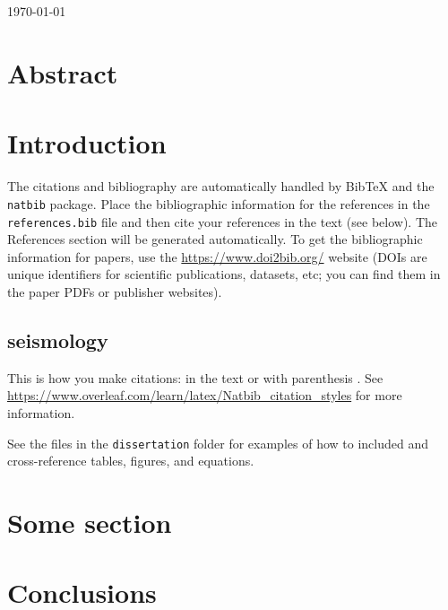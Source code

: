\documentclass[12pt,a4paper,onecolumn,oneside]{article}
\begin{document}
\thispagestyle{empty}
\begin{center}
  {\LARGE \Title{}}
  \\[0.3cm]
  {\large \Name{}}
  \\[0.3cm]
  {\monthyear\today}
\end{center}


\section*{Abstract}

\lipsum[1]



\section{Introduction}

The citations and bibliography are automatically handled by
BibTeX and the \texttt{natbib} package. Place the bibliographic information for
the references in the \texttt{references.bib} file and then cite your
references in the text (see below). The References section will be generated
automatically. To get the bibliographic information for papers, use the
\url{https://www.doi2bib.org/} website (DOIs are unique identifiers for
scientific publications, datasets, etc; you can find them in the paper PDFs or
publisher websites). \cite{Laske2013}

\subsection {seismology}

This is how you make citations: in the text \cite{Parker1973} or with
parenthesis \citep{Parker1973}. See
\url{https://www.overleaf.com/learn/latex/Natbib_citation_styles} for more
information.

See the files in the \texttt{dissertation} folder for examples of how to
included and cross-reference tables, figures, and equations.


\section{Some section}




\section{Conclusions}




\renewcommand{\bibname}{References}

\end{document}
